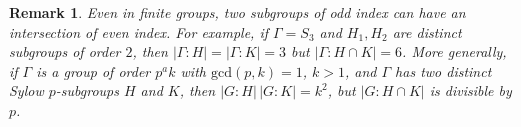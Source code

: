 \documentclass[10pt,a4paper]{amsart}
\newtheorem{lemma}[theorem]{Lemma}
\newtheorem{remark}[theorem]{Remark}
\theoremstyle{definition}
\theoremstyle{definition}
\numberwithin{equation}{section}
\begin{document}
\begin{remark}{\em Even in finite groups, two subgroups of odd index can have an intersection of even index. For example, if $\Gamma=S_3$ and $H_1, H_2$ are distinct subgroups of order $2$, then $|\Gamma\colon H|=|\Gamma\colon K|=3$ but $|\Gamma\colon H\cap K|=6$. More generally, if $\Gamma$ is a group of order $p^ak$ with $\mbox{gcd}(p,k)=1$, $k>1$, and $\Gamma$ has two distinct Sylow $p$-subgroups $H$ and $K$, then $|G:H|\, |G:K|=k^2$, but $|G:H\cap K|$ is divisible by $p$. }
\end{remark}

\end{document}
